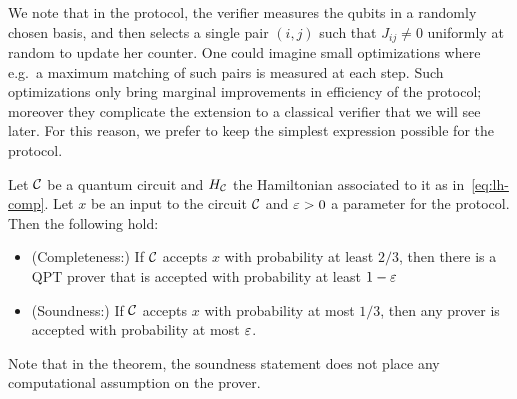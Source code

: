 We note that in the protocol, the verifier measures the qubits in a randomly chosen basis, and then selects a single pair $(i,j)$ such that $J_{ij}\neq 0$ uniformly at random to update her counter. One could imagine small optimizations where e.g.\ a maximum matching of such pairs is measured at each step. Such optimizations only bring marginal improvements in efficiency of the protocol; moreover they complicate the extension to a classical verifier that we will see later. For this reason, we prefer to keep the simplest expression possible for the protocol. 


\begin{theorem}\label{thm:fm}
Let $\mathcal{C}$ be a quantum circuit and $H_{\mathcal{C}}$ the Hamiltonian associated to it as in~\eqref{eq:lh-comp}. Let $x$ be an input to the circuit $\mathcal{C}$ and $\varepsilon>0$ a parameter for the protocol. Then the following hold:
\begin{itemize}
\item (Completeness:) If $\mathcal{C}$ accepts $x$ with probability at least $2/3$, then there is a QPT prover that is accepted with probability at least $1-\varepsilon$
\item (Soundness:) If $\mathcal{C}$ accepts $x$ with probability at most $1/3$, then any prover is accepted with probability at most $\varepsilon$. 
\end{itemize}
\end{theorem}

Note that in the theorem, the soundness statement does not place any computational assumption on the prover. 

